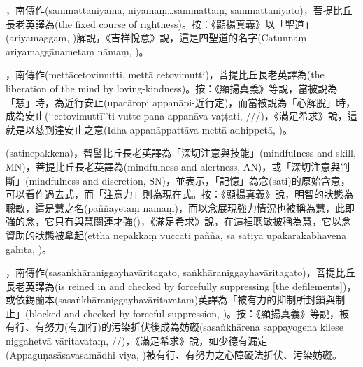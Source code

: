 \startitemgroup[noteitems]
\item{}，南傳作(sammattaniyāma, niyāmaṃ…sammattaṃ, sammattaniyato)，菩提比丘長老英譯為(the fixed course of rightness)。按：《顯揚真義》以「聖道」(ariyamaggaṃ, )解說，《吉祥悅意》說，這是四聖道的名字(Catunnaṃ ariyamaggānametaṃ nāmaṃ, )。
\stopitemgroup

\startitemgroup[noteitems]
\item{}，南傳作(mettācetovimutti, mettā cetovimutti)，菩提比丘長老英譯為(the liberation of the mind by loving-kindness)。按：《顯揚真義》等說，當被說為「慈」時，為近行安止(upacāropi appanāpi-近行定)，而當被說為「心解脫」時，成為安止(‘‘cetovimuttī’’ti vutte pana appanāva vaṭṭati, ///)，《滿足希求》說，這就是以慈到達安止之意(Idha appanāppattāva mettā adhippetā, )。
\stopitemgroup

\startitemgroup[noteitems]
\item{}(satinepakkena)，智髻比丘長老英譯為「深切注意與技能」(mindfulness and skill, MN)，菩提比丘長老英譯為(mindfulness and alertness, AN)，或「深切注意與判斷」(mindfulness and discretion, SN)，並表示，「記憶」為念(sati)的原始含意，可以看作過去式，而「注意力」則為現在式。按：《顯揚真義》說，明智的狀態為聰敏，這是慧之名(paññāyetaṃ nāmaṃ)，而以念展現強力情況也被稱為慧，此即強的念，它只有與慧關連才強()，《滿足希求》說，在這裡聰敏被稱為慧，它以念資助的狀態被拿起(ettha nepakkaṃ vuccati paññā, sā satiyā upakārakabhāvena gahitā, )。
\stopitemgroup

\startitemgroup[noteitems]
\item{}，南傳作(sasaṅkhāraniggayhavāritagato, saṅkhāraniggayhavāritagato)，菩提比丘長老英譯為(is reined in and checked by forcefully suppressing [the defilements])，或依錫蘭本(sasaṅkhāraniggayhavāritavataṃ)英譯為「被有力的抑制所封鎖與制止」(blocked and checked by forceful suppression, )。按：《顯揚真義》等說，被有行、有努力(有加行)的污染折伏後成為妨礙(sasaṅkhārena sappayogena kilese niggahetvā vāritavataṃ, //)，《滿足希求》說，如少德有漏定(Appaguṇasāsavasamādhi viya, )被有行、有努力之心障礙法折伏、污染妨礙。
\stopitemgroup

